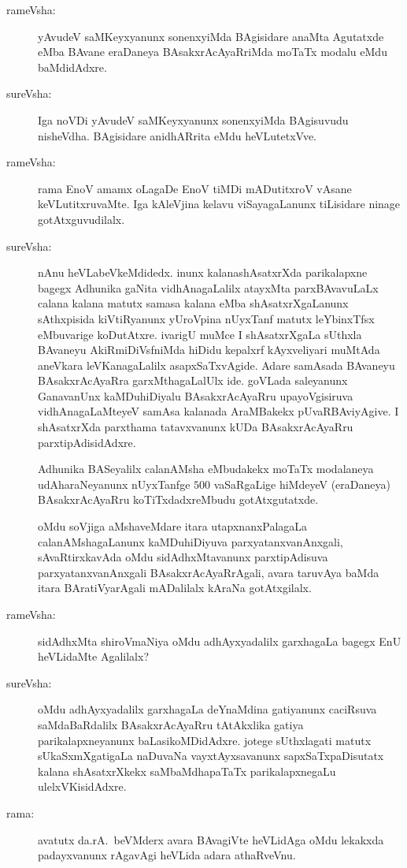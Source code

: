 \begin{description}
\item[rameVsha:] yAvudeV saMKeyxyanunx sonenxyiMda BAgisidare anaMta Agutatxde eMba BAvane eraDaneya BAsakxrAcAyaRriMda moTaTx modalu eMdu baMdidAdxre.

\item[sureVsha:] Iga noVDi yAvudeV saMKeyxyanunx sonenxyiMda BAgisuvudu nisheVdha. BAgisidare anidhARrita eMdu heVLutetxVve.

\item[rameVsha:] rama EnoV amamx oLagaDe EnoV tiMDi mADutitxroV vAsane keVLutitxruvaMte. Iga kAleVjina kelavu viSayagaLanunx tiLisidare ninage gotAtxguvudilalx.

\item[sureVsha:] nAnu heVLabeVkeMdidedx. inunx kalanashAsatxrXda parikalapxne bagegx Adhunika gaNita vidhAnagaLalilx atayxMta parxBAvavuLaLx calana kalana matutx samasa kalana eMba shAsatxrXgaLanunx sAthxpisida kiVtiRyanunx yUroVpina nUyxTanf matutx leYbinxTfsx eMbuvarige koDutAtxre. ivarigU muMce I shAsatxrXgaLa sUthxla BAvaneyu AkiRmiDiVsfniMda hiDidu kepalxrf kAyxveliyari muMtAda aneVkara leVKanagaLalilx asapxSaTxvAgide. Adare samAsada BAvaneyu BAsakxrAcAyaRra garxMthagaLalUlx ide. goVLada saleyanunx GanavanUnx kaMDuhiDiyalu BAsakxrAcAyaRru upayoVgisiruva vidhAnagaLaMteyeV samAsa kalanada AraMBakekx pUvaRBAviyAgive. I shAsatxrXda parxthama tatavxvanunx kUDa BAsakxrAcAyaRru parxtipAdisidAdxre.

Adhunika BASeyalilx calanAMsha eMbudakekx moTaTx modalaneya udAharaNeyanunx nUyxTanfge $500$ vaSaRgaLige hiMdeyeV (eraDaneya) BAsakxrAcAyaRru koTiTxdadxreMbudu gotAtxgutatxde.

oMdu soVjiga aMshaveMdare itara utapxnanxPalagaLa calanAMshagaLanunx kaMDuhiDiyuva parxyatanxvanAnxgali, sAvaRtirxkavAda oMdu sidAdhxMtavanunx parxtipAdisuva parxyatanxvanAnxgali BAsakxrAcAyaRrAgali, avara taruvAya baMda itara BAratiVyarAgali mADalilalx kAraNa gotAtxgilalx.

\item[rameVsha:] sidAdhxMta shiroVmaNiya oMdu adhAyxyadalilx garxhagaLa bagegx EnU heVLidaMte Agalilalx?

\item[sureVsha:] oMdu adhAyxyadalilx garxhagaLa deYnaMdina gatiyanunx caciRsuva saMdaBaRdalilx BAsakxrAcAyaRru tAtAkxlika gatiya parikalapxneyanunx baLasikoMDidAdxre. jotege sUthxlagati matutx sUkaSxmXgatigaLa naDuvaNa vayxtAyxsavanunx sapxSaTxpaDisutatx kalana shAsatxrXkekx saMbaMdhapaTaTx parikalapxnegaLu ulelxVKisidAdxre.

\item[rama:] avatutx da.rA.\ beVMderx avara BAvagiVte heVLidAga oMdu lekakxda padayxvanunx rAgavAgi heVLida adara athaRveVnu.


\end{description}
